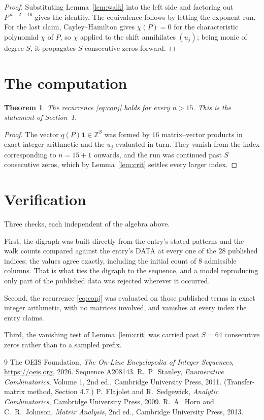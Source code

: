 \documentclass[11pt,a4paper]{article}
\theoremstyle{plain}
\newtheorem{theorem}{Theorem}
\theoremstyle{definition}
\begin{document}
\begin{proof}
Substituting Lemma~\ref{lem:walk} into the left side and factoring out
$P^{\,n-2-16}$ gives the identity. The equivalence follows by letting the exponent
run. For the last claim, Cayley--Hamilton gives $\chi(P)=0$ for the characteristic
polynomial $\chi$ of $P$, so $\chi$ applied to the shift annihilates $(u_j)$; being monic of
degree $S$, it propagates $S$ consecutive zeros forward.
\end{proof}

\section{The computation}

\begin{theorem}
The recurrence \eqref{eq:conj} holds for every $n>15$. This is the statement of
Section~1.
\end{theorem}

\begin{proof}
The vector $q(P)\mathbf{1}\in\mathbb{Z}^{S}$ was formed by $16$ matrix--vector
products in exact integer arithmetic and the $u_j$ evaluated in turn. They vanish from the
index corresponding to $n=15+1$ onwards, and the run was continued past $S$ consecutive
zeros, which by Lemma~\ref{lem:crit} settles every larger index.
\end{proof}

\section{Verification}

Three checks, each independent of the algebra above.

First, the digraph was built directly from the entry's stated patterns and the walk counts
compared against the entry's DATA at every one of the $28$ published indices; the
values agree exactly, including the initial count of $8$ admissible columns. That is
what ties the digraph to the sequence, and a model reproducing only part of the published
data was rejected wherever it occurred.

Second, the recurrence \eqref{eq:conj} was evaluated on those published terms in exact
integer arithmetic, with no matrices involved, and vanishes at every index the entry claims.

Third, the vanishing test of Lemma~\ref{lem:crit} was carried past $S=64$ consecutive
zeros rather than to a sampled prefix.

\begin{thebibliography}{9}
 The OEIS Foundation, \emph{The On-Line Encyclopedia of Integer
Sequences}, \url{https://oeis.org}, 2026. Sequence A208143.
 R.~P.~Stanley, \emph{Enumerative Combinatorics}, Volume 1, 2nd ed.,
Cambridge University Press, 2011. (Transfer-matrix method, Section 4.7.)
 P.~Flajolet and R.~Sedgewick, \emph{Analytic Combinatorics}, Cambridge
University Press, 2009.
 R.~A.~Horn and C.~R.~Johnson, \emph{Matrix Analysis}, 2nd ed., Cambridge
University Press, 2013.
\end{thebibliography}
\end{document}
